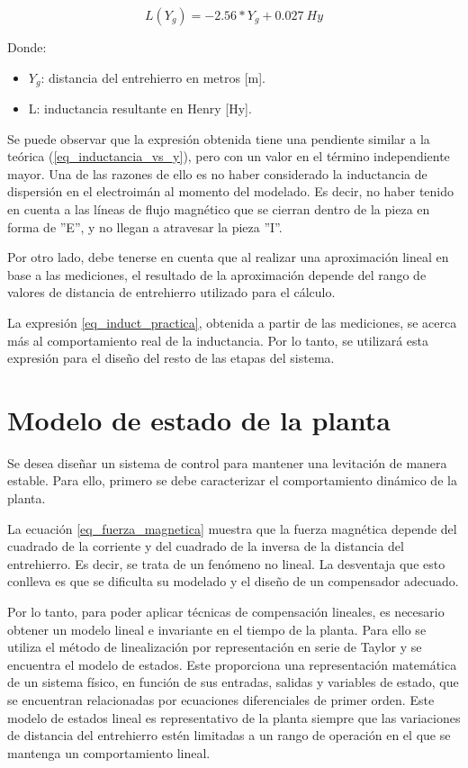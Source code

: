 \begin{equation}
	\label{eq_induct_practica}
	L(Y_g)=-2.56*Y_{g}+0.027\:Hy
\end{equation}

\noindent Donde:
\begin{itemize}
	\item $Y_{g}$: distancia del entrehierro en metros [m].
	\item L: inductancia resultante en Henry [Hy].
\end{itemize}

Se puede observar que la expresión obtenida tiene una pendiente similar a la teórica (\ref{eq_inductancia_vs_y}), pero con un valor en el término independiente mayor. Una de las razones de ello es no haber considerado la inductancia de dispersión en el electroimán al momento del modelado. Es decir, no haber tenido en cuenta a las líneas de flujo magnético que se cierran dentro de la pieza en forma de ”E”, y no llegan a atravesar la pieza ”I”.  

Por otro lado, debe tenerse en cuenta que al realizar una aproximación lineal en base a las mediciones, el resultado de la aproximación depende del rango de valores de distancia de entrehierro utilizado para el cálculo. 

La expresión \ref{eq_induct_practica}, obtenida a partir de las mediciones, se acerca más al comportamiento real de la inductancia. Por lo tanto, se utilizará esta expresión para el diseño del resto de las etapas del sistema. 


\section{Modelo de estado de la planta}

Se desea diseñar un sistema de control para mantener una levitación de manera estable. Para ello, primero se debe caracterizar el comportamiento dinámico de la planta.

La ecuación \ref{eq_fuerza_magnetica} muestra que la fuerza magnética depende del cuadrado de la corriente y del cuadrado de la inversa de la distancia del entrehierro. Es decir, se trata de un fenómeno no lineal. La desventaja que esto conlleva es que se dificulta su modelado y el diseño de un compensador adecuado.

Por lo tanto, para poder aplicar técnicas de compensación lineales, es necesario obtener un modelo lineal e invariante en el tiempo de la planta. Para ello se utiliza el método de linealización por representación en serie de Taylor y se encuentra el modelo de estados. Este proporciona una representación matemática de un sistema físico, en función de sus entradas, salidas y variables de estado, que se encuentran relacionadas por ecuaciones diferenciales de primer orden. Este modelo de estados lineal es representativo de la planta siempre que las variaciones de distancia del entrehierro estén limitadas a un rango de operación en el que se mantenga un comportamiento lineal.



